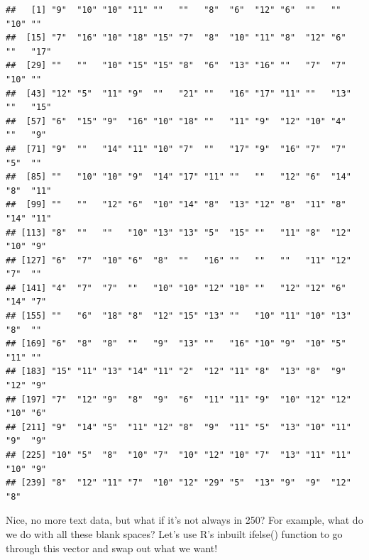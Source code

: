 \documentclass[]{book}
\newenvironment{Shaded}{\begin{snugshade}}{\end{snugshade}}
\newcommand{\KeywordTok}[1]{\textcolor[rgb]{0.13,0.29,0.53}{\textbf{#1}}}
\newcommand{\StringTok}[1]{\textcolor[rgb]{0.31,0.60,0.02}{#1}}
\newcommand{\OperatorTok}[1]{\textcolor[rgb]{0.81,0.36,0.00}{\textbf{#1}}}
\newcommand{\NormalTok}[1]{#1}
\theoremstyle{definition}
\theoremstyle{definition}
\theoremstyle{definition}
\theoremstyle{remark}
\begin{document}
\begin{verbatim}
##   [1] "9"  "10" "10" "11" ""   ""   "8"  "6"  "12" "6"  ""   ""   "10" ""  
##  [15] "7"  "16" "10" "18" "15" "7"  "8"  "10" "11" "8"  "12" "6"  ""   "17"
##  [29] ""   ""   "10" "15" "15" "8"  "6"  "13" "16" ""   "7"  "7"  "10" ""  
##  [43] "12" "5"  "11" "9"  ""   "21" ""   "16" "17" "11" ""   "13" ""   "15"
##  [57] "6"  "15" "9"  "16" "10" "18" ""   "11" "9"  "12" "10" "4"  ""   "9" 
##  [71] "9"  ""   "14" "11" "10" "7"  ""   "17" "9"  "16" "7"  "7"  "5"  ""  
##  [85] ""   "10" "10" "9"  "14" "17" "11" ""   ""   "12" "6"  "14" "8"  "11"
##  [99] ""   ""   "12" "6"  "10" "14" "8"  "13" "12" "8"  "11" "8"  "14" "11"
## [113] "8"  ""   ""   "10" "13" "13" "5"  "15" ""   "11" "8"  "12" "10" "9" 
## [127] "6"  "7"  "10" "6"  "8"  ""   "16" ""   ""   ""   "11" "12" "7"  ""  
## [141] "4"  "7"  "7"  ""   "10" "10" "12" "10" ""   "12" "12" "6"  "14" "7" 
## [155] ""   "6"  "18" "8"  "12" "15" "13" ""   "10" "11" "10" "13" "8"  ""  
## [169] "6"  "8"  "8"  ""   "9"  "13" ""   "16" "10" "9"  "10" "5"  "11" ""  
## [183] "15" "11" "13" "14" "11" "2"  "12" "11" "8"  "13" "8"  "9"  "12" "9" 
## [197] "7"  "12" "9"  "8"  "9"  "6"  "11" "11" "9"  "10" "12" "12" "10" "6" 
## [211] "9"  "14" "5"  "11" "12" "8"  "9"  "11" "5"  "13" "10" "11" "9"  "9" 
## [225] "10" "5"  "8"  "10" "7"  "10" "12" "10" "7"  "13" "11" "11" "10" "9" 
## [239] "8"  "12" "11" "7"  "10" "12" "29" "5"  "13" "9"  "9"  "12" "8"
\end{verbatim}

Nice, no more text data, but what if it's not always in 250? For
example, what do we do with all these blank spaces? Let's use R's
inbuilt ifelse() function to go through this vector and swap out what we
want!

\begin{Shaded}
\end{Shaded}
\end{document}
